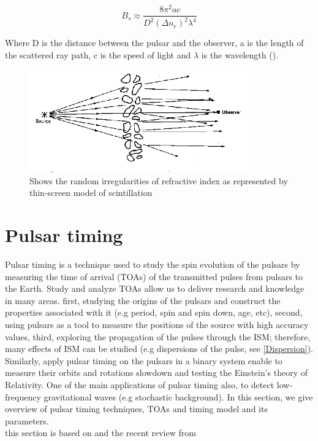 \begin{equation}
\label{dm scintillation}
B_{s} \approx \frac{8 \pi^2 a c}{D^2 (\Delta n_e)^2 \lambda^4}
\end{equation}

Where D is the distance between the pulsar and the observer, a is the length of the scattered ray path, c is the speed of light and $\lambda$ is the wavelength (\citet{lyne2012pulsar}).

\begin{figure}[H] 
\centering    
\includegraphics[width=0.85\textwidth]{scintt.png}
\caption[scintilation]{Shows the random irregularities of refractive index as represented by thin-screen model of scintillation}
\label{fig:sscint_model}
\end{figure}


\section{Pulsar timing}  %
\label{section1.3}
Pulsar timing is a technique used to study the spin evolution of the pulsars by measuring the time of arrival (TOAs) of the transmitted pulses from pulsars to the Earth. Study and analyze TOAs allow us to deliver research and knowledge in many areas. first, studying the origins of the pulsars and construct the properties associated with it (e.g period, spin and spin down, age, etc), second, using pulsars as a tool to measure the positions of the source with high accuracy values, third, exploring the propagation of the pulses through the ISM; therefore, many effects of ISM can be studied (e.g dispersions of the pulse, see \ref{Dispersion}).\\
Similarly, apply pulsar timing on the pulsars in a binary system enable to measure their orbits and rotations slowdown and testing the Einstein's theory of Relativity. One of the main applications of pulsar timing also, to detect low-frequency gravitational waves (e.g stochastic background). In this section, we give overview of pulsar timing techniques, TOAs and timing model and its parameters.\\
this section is based on \citet{lorimer2005handbook} and the recent review from \citet{manchester2017pulsar}\\


